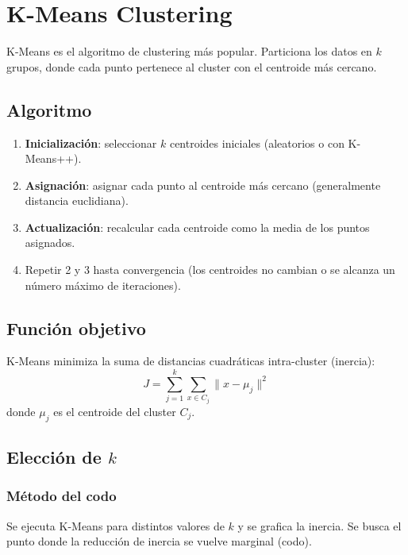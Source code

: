 \documentclass[12pt,a4paper,openany,oneside]{book}
\begin{document}
\section{K-Means Clustering}

K-Means es el algoritmo de clustering más popular. Particiona los datos en \(k\) grupos, donde cada punto pertenece al cluster con el centroide más cercano.

\subsection{Algoritmo}
\begin{enumerate}
    \item \textbf{Inicialización}: seleccionar \(k\) centroides iniciales (aleatorios o con K-Means++).
    \item \textbf{Asignación}: asignar cada punto al centroide más cercano (generalmente distancia euclidiana).
    \item \textbf{Actualización}: recalcular cada centroide como la media de los puntos asignados.
    \item Repetir 2 y 3 hasta convergencia (los centroides no cambian o se alcanza un número máximo de iteraciones).
\end{enumerate}

\subsection{Función objetivo}
K-Means minimiza la suma de distancias cuadráticas intra-cluster (inercia):
\[
J = \sum_{j=1}^k \sum_{x \in C_j} \|x - \mu_j\|^2
\]
donde \(\mu_j\) es el centroide del cluster \(C_j\).

\subsection{Elección de \(k\)}

\subsubsection{Método del codo}
Se ejecuta K-Means para distintos valores de \(k\) y se grafica la inercia. Se busca el punto donde la reducción de inercia se vuelve marginal (codo).

\begin{center}
\caption{Método del codo. El codo se observa en \(k=3\) o \(k=4\).}
\end{center}
\end{document}
